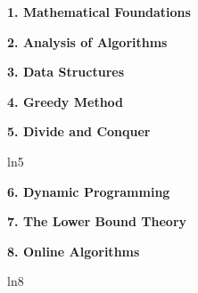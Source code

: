 \documentclass[8pt]{minimal}
\begin{document}
\begin{flushleft}
\begin{multicols}{3}


    \textbf{1. Mathematical Foundations}
    

    \textbf{2. Analysis of Algorithms}
    

    \textbf{3. Data Structures}

    
    \textbf{4. Greedy Method}
    


    \textbf{5. Divide and Conquer}

    ln5


    \textbf{6. Dynamic Programming}
    

    \textbf{7. The Lower Bound Theory}

    


    \textbf{8. Online Algorithms}

    ln8
    

    \lipsum
    \lipsum

\end{multicols}
\end{flushleft}
\end{document}
